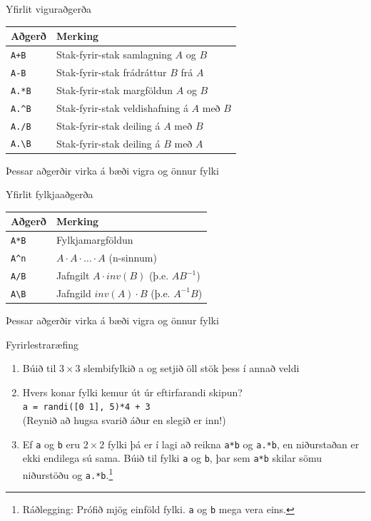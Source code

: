 \documentclass[handout]{beamer}
\begin{document}
\begin{frame}{Yfirlit viguraðgerða}
\begin{center}
\begin{tabular}{ll}
\toprule
Aðgerð&Merking\\
\midrule
\texttt{A+B}&Stak-fyrir-stak samlagning $A$ og $B$\\
\texttt{A-B}&Stak-fyrir-stak frádráttur $B$ frá $A$\\
\texttt{A.*B}&Stak-fyrir-stak margföldun $A$ og $B$\\
\texttt{A.\^{}B}&Stak-fyrir-stak veldishafning á $A$ með $B$\\
\texttt{A./B}&Stak-fyrir-stak deiling á $A$ með $B$\\
\texttt{A.\textbackslash B}&Stak-fyrir-stak deiling á $B$ með $A$\\
\bottomrule
\end{tabular}
\end{center}
Þessar aðgerðir virka á bæði vigra og önnur fylki
\end{frame}

\begin{frame}{Yfirlit fylkjaaðgerða}
\begin{center}
\begin{tabular}{ll}
\toprule
Aðgerð&Merking\\
\midrule
\texttt{A*B}&Fylkjamargföldun\\
\texttt{A\^{}n}&$A\cdot A\cdot \ldots \cdot A$ (n-sinnum)\\
\texttt{A/B}&Jafngilt  $A\cdot inv(B)$ (þ.e. $AB^{-1}$)\\
\texttt{A\textbackslash B}&Jafngild $inv(A)\cdot B$  (þ.e. $A^{-1}B$)\\
\bottomrule
\end{tabular}
\end{center}
Þessar aðgerðir virka á bæði vigra og önnur fylki
\end{frame}

\begin{frame}{Fyrirlestraræfing}
    \begin{enumerate}
     \item Búið til $3 \times 3$ slembifylkið a og setjið öll stök þess í annað veldi
     \item Hvers konar fylki kemur út úr eftirfarandi skipun? \\ \texttt{a = randi([0 1], 5)*4 + 3} \\
     (Reynið að hugsa svarið áður en slegið er inn!)
     \item Ef \texttt{a} og \texttt{b} eru $2 \times 2$ fylki þá er í lagi að reikna \texttt{a*b} og \texttt{a.*b}, en niðurstaðan er ekki endilega sú sama.  Búið til fylki \texttt{a} og \texttt{b}, þar sem \texttt{a*b} skilar sömu niðurstöðu og \texttt{a.*b}.\footnote{Ráðlegging: Prófið mjög einföld fylki. \texttt{a} og \texttt{b} mega vera eins.}
    \end{enumerate}
\end{frame}
\end{document}

